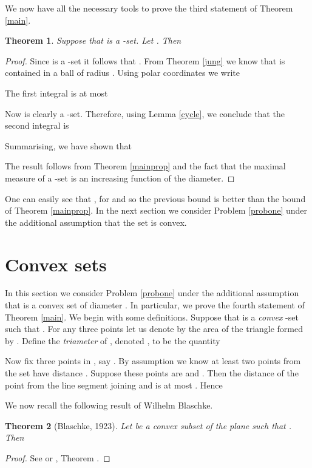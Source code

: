 \documentclass[12pt]{article}
\newtheorem{thm}{Theorem}[section]
\begin{document}
 
We now have all the necessary tools to prove the third statement of Theorem \ref{main}.

\begin{thm}\label{polar} Suppose that  is a -set.
Let . Then

\end{thm}
\begin{proof}  Since  is a  -set
it follows that .
From Theorem \ref{jung} we know that  is contained 
in a ball of radius . Using polar coordinates we write

The first integral is at most 

Now  is clearly a -set. Therefore,
using Lemma \ref{cycle}, we conclude that the second integral is
 
Summarising, we have shown that

The result follows from Theorem \ref{mainprop} and the fact that the maximal measure of 
a -set  is an increasing function of the diameter.
\end{proof}

One can easily see that , for  
and so the previous bound is better than the bound of Theorem \ref{mainprop}.
In the next section we consider Problem \ref{probone} under the additional assumption that 
the set  is convex. 

\section{Convex sets}\label{convex}

In this section we consider Problem \ref{probone} under the additional assumption that 
 is a convex set of diameter . 
In particular, 
we prove the fourth statement of Theorem \ref{main}. 
We begin with some definitions. 
Suppose that  is a \emph{convex} -set   
such that .
For any three points  let us denote by  the 
area of the triangle formed by . 
Define the \emph{triameter} of , denoted , to be the quantity

Now fix three points in , say .
By assumption we know at least two points from 
the set  have distance . Suppose these points are  and . 
Then the distance of the point  from the line segment joining  and  is at most .
Hence 

We now recall the following result of Wilhelm Blaschke.

\begin{thm}[Blaschke, 1923]
\label{Blaschke} Let  be a convex subset of the plane such that .
Then 

\end{thm}
\begin{proof} See \cite{Chakerian} or \cite{Pach}, Theorem .
\end{proof}
\end{document}
